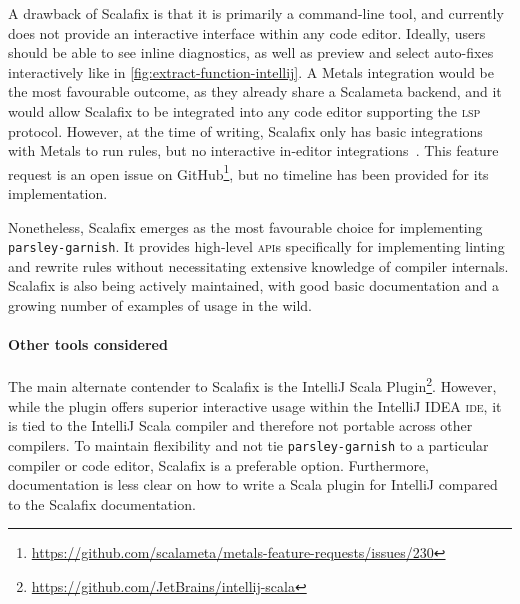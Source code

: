 \documentclass[../../main.tex]{subfiles}
\begin{document}

A drawback of Scalafix is that it is primarily a command-line tool, and currently does not provide an interactive interface within any code editor.
Ideally, users should be able to see inline diagnostics, as well as preview and select auto-fixes interactively like in \cref{fig:extract-function-intellij}.
A Metals integration would be the most favourable outcome, as they already share a Scalameta backend, and it would allow Scalafix to be integrated into any code editor supporting the \textsc{lsp} protocol.
However, at the time of writing, Scalafix only has basic integrations with Metals to run rules, but no interactive in-editor integrations~\cite{jaglin_scalafix_2024}.
This feature request is an open issue on GitHub\footnote{\url{https://github.com/scalameta/metals-feature-requests/issues/230}}, but no timeline has been provided for its implementation.

Nonetheless, Scalafix emerges as the most favourable choice for implementing \texttt{parsley-garnish}.
It provides high-level \textsc{api}s specifically for implementing linting and rewrite rules without necessitating extensive knowledge of compiler internals.
Scalafix is also being actively maintained, with good basic documentation and a growing number of examples of usage in the wild.

\paragraph{Other tools considered}
The main alternate contender to Scalafix is the IntelliJ Scala Plugin\footnote{\url{https://github.com/JetBrains/intellij-scala}}.
However, while the plugin offers superior interactive usage within the IntelliJ IDEA \textsc{ide}, it is tied to the IntelliJ Scala compiler and therefore not portable across other compilers.
To maintain flexibility and not tie \texttt{parsley-garnish} to a particular compiler or code editor, Scalafix is a preferable option.
Furthermore, documentation is less clear on how to write a Scala plugin for IntelliJ compared to the Scalafix documentation.
\end{document}
